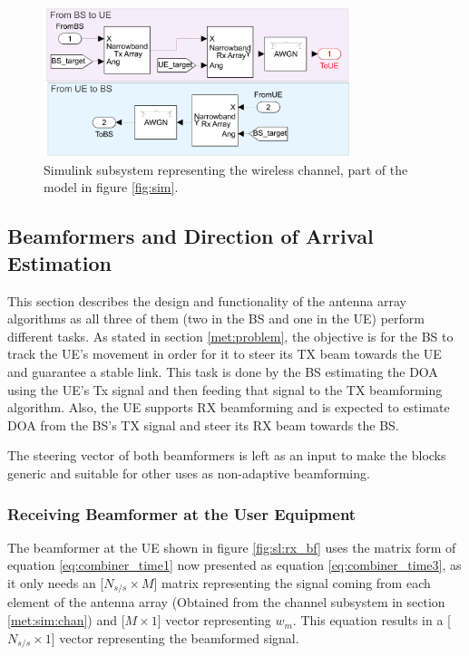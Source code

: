 \documentclass[12pt,a4paper]{report}
\begin{document}
\begin{figure}[h]
    \centering
    \includegraphics[width = 0.8\textwidth]{Figures/SL_channel.png}
    \caption[Simulink subsystem representing the wireless channel.]{Simulink subsystem representing the wireless channel, part of the model in figure \ref{fig:sim}.}
    \label{fig:sl:channel}
\end{figure}

\newpage
\subsection{Beamformers and Direction of Arrival Estimation} \label{met:sim:bf}
This section describes the design and functionality of the antenna array algorithms as all three of them (two in the BS and one in the UE) perform different tasks. As stated in section \ref{met:problem}, the objective is for the BS to track the UE's movement in order for it to steer its TX beam towards the UE and guarantee a stable link. This task is done by the BS estimating the DOA using the UE's Tx signal and then feeding that signal to the TX beamforming algorithm. Also, the UE supports RX beamforming and is expected to estimate DOA from the BS's TX signal and steer its RX beam towards the BS.

The steering vector of both beamformers is left as an input to make the blocks generic and suitable for other uses as non-adaptive beamforming.

\subsubsection{Receiving Beamformer at the User Equipment} \label{met:sim:bf:rx}
The beamformer at the UE shown in figure \ref{fig:sl:rx_bf} uses the matrix form of equation \ref{eq:combiner_time1} now presented as equation \ref{eq:combiner_time3}, as it only needs an [$N_{s/s} \times M$] matrix representing the signal coming from each element of the antenna array (Obtained from the channel subsystem in section \ref{met:sim:chan}) and [$M \times 1$] vector representing $w_m$. This equation results in a [$N_{s/s} \times 1$] vector representing the beamformed signal.
\end{document}
